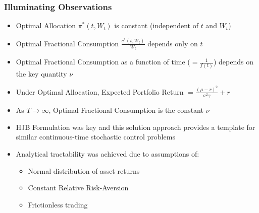 \documentclass{beamer}
\begin{document}
\begin{frame}
\frametitle{Illuminating Observations}
\begin{itemize}
\item Optimal Allocation $\pi^*(t, W_t)$ is constant (independent of $t$ and $W_t$)
\item Optimal Fractional Consumption $\frac {c^*(t, W_t)} {W_t}$ depends only on $t$
\item Optimal Fractional Consumption as a function of time ($=\frac 1 {f(t)}$) depends on the key quantity $\nu$ 
\item Under Optimal Allocation, Expected Portfolio Return $=\frac {(\mu - r)^2} {\sigma^2 \gamma} + r$
\item As $T \rightarrow \infty$, Optimal Fractional Consumption is the constant $\nu$
\item HJB Formulation was key and this solution approach provides a template for similar continuous-time stochastic control problems
\item Analytical tractability was achieved due to assumptions of:
\begin{itemize}
\item Normal distribution of asset returns
\item Constant Relative Risk-Aversion
\item Frictionless trading
\end{itemize}
\end{itemize}
\end{frame}
\end{document}
